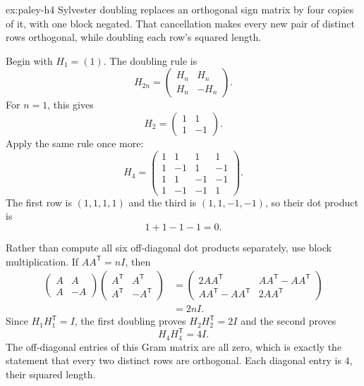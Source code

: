 \begin{solution}{ex:paley-h4}
\idea Sylvester doubling replaces an orthogonal sign matrix by four copies of it, with one block negated. That cancellation makes every new pair of distinct rows orthogonal, while doubling each row's squared length.

\writeup Begin with $H_1=(1)$. The doubling rule is
\[
H_{2n}=\begin{pmatrix}H_n&H_n\\H_n&-H_n\end{pmatrix}.
\]
For $n=1$, this gives
\[
H_2=\begin{pmatrix}1&1\\1&-1\end{pmatrix}.
\]
Apply the same rule once more:
\[
\boxed{H_4=
\begin{pmatrix}
1&1&1&1\\
1&-1&1&-1\\
1&1&-1&-1\\
1&-1&-1&1
\end{pmatrix}}.
\]
The first row is $(1,1,1,1)$ and the third is $(1,1,-1,-1)$, so their dot product is
\[
1+1-1-1=\boxed{0}.
\]

Rather than compute all six off-diagonal dot products separately, use block multiplication. If $AA^{\mathsf T}=nI$, then
\[
\begin{aligned}
\begin{pmatrix}A&A\\A&-A\end{pmatrix}
\begin{pmatrix}A^{\mathsf T}&A^{\mathsf T}\\
A^{\mathsf T}&-A^{\mathsf T}\end{pmatrix}
&=\begin{pmatrix}
2AA^{\mathsf T}&AA^{\mathsf T}-AA^{\mathsf T}\\
AA^{\mathsf T}-AA^{\mathsf T}&2AA^{\mathsf T}
\end{pmatrix}\\
&=2nI.
\end{aligned}
\]
Since $H_1H_1^{\mathsf T}=I$, the first doubling proves $H_2H_2^{\mathsf T}=2I$ and the second proves
\[
\boxed{H_4H_4^{\mathsf T}=4I}.
\]
The off-diagonal entries of this Gram matrix are all zero, which is exactly the statement that every two distinct rows are orthogonal. Each diagonal entry is $4$, their squared length.
\end{solution}

